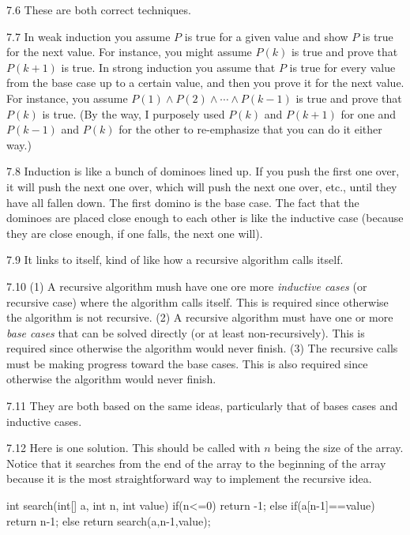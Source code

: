\begin{RequAnswer}{7.6}
These are both correct techniques.
\end{RequAnswer}
\begin{RequAnswer}{7.7}
In weak induction you assume $P$ is true for a given value and show $P$ is true for the next value.
For instance, you might assume $P(k)$ is true and prove that $P(k+1)$ is true.
In strong induction you assume that $P$ is true for every value from the base case up to a certain value,
and then you prove it for the next value.
For instance, you assume $P(1)\wedge P(2)\wedge\cdots \wedge P(k-1)$ is true
and prove that $P(k)$ is true.
(By the way, I purposely used $P(k)$ and $P(k+1)$ for one and $P(k-1)$ and $P(k)$ for the other
to re-emphasize that you can do it either way.)
\end{RequAnswer}
\begin{RequAnswer}{7.8}
Induction is like a bunch of dominoes lined up. If you push the first one over, it will push the next one over, which will push
the next one over, etc., until they have all fallen down. The first domino is the base case. The fact that the dominoes
are placed close enough to each other is like the inductive case (because they are close enough, if one falls, the next one will).
\end{RequAnswer}
\begin{RequAnswer}{7.9}
It links to itself, kind of like how a recursive algorithm calls itself.
\end{RequAnswer}
\begin{RequAnswer}{7.10}
(1) A recursive algorithm mush have one ore more {\em inductive cases} (or recursive case) where the algorithm calls itself.
This is required since otherwise the algorithm is not recursive.
(2) A recursive algorithm must have one or more {\em base cases} that can be solved directly (or at least non-recursively).
This is required since otherwise the algorithm would never finish.
(3) The recursive calls must be making progress toward the base cases.
This is also required since otherwise the algorithm would never finish.
\end{RequAnswer}
\begin{RequAnswer}{7.11}
They are both based on the same ideas, particularly that of bases cases and inductive cases.
\end{RequAnswer}
\begin{RequAnswer}{7.12}
Here is one solution.
This should be called with $n$ being the size of the array.
Notice that it searches from the end of the array to the beginning of the array
because it is the most straightforward way to implement the recursive idea.
\begin{code}
int search(int[] a, int n, int value) {
    if(n<=0) {
        return -1;
    } else if(a[n-1]==value) {
       return n-1;
    } else {
        return search(a,n-1,value);
    }
}
\end{code}
\end{RequAnswer}
